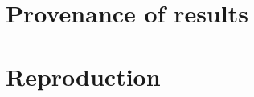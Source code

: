 \chapter{Provenance of results}
\label{app:provenance}

\chapter{Reproduction}
\label{app:reproduction}
